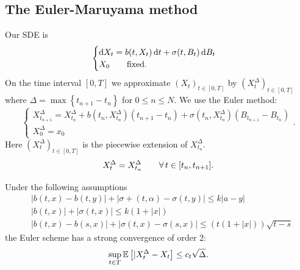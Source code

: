 \documentclass[12pt]{report}
\begin{document}
\subsection{The Euler-Maruyama method}
Our SDE is
\begin{equation*}
	\begin{cases}
		\mathop{}\!\mathrm{d} X_t=b(t,X_t)\mathop{}\!\mathrm{d} t+\sigma(t,B_t)\mathop{}\!\mathrm{d} B_t\\
		X_0\qquad\text{fixed}.
	\end{cases}
\end{equation*}
On the time interval $[0,T]$ we approximate ${(X_{t})}_{t\in[0,T]}$ by ${(X^{\Delta}_{t})}_{t\in[0,T]}$ where $\Delta=\max\left\{t_{n+1}-t_{n}\right\}$ for $0\leq n\leq N$. We use the Euler method:
\begin{equation*}
	\begin{cases}
		X^{\Delta}_{t_{n+1}}=X^{\Delta}_{t_{n}}+b(t_{n},X_{t_{n}}^{\Delta})(t_{n+1}-t_{n})+\sigma(t_{n},X^{\Delta}_{t_{n}})(B_{t_{n+1}}-B_{t_{n}})\\
		X^{\Delta}_0=x_0
	\end{cases}.
\end{equation*}
Here ${(X^{\Delta}_{t})}_{t\in[0,T]}$ is the piecewise extension of $X^{\Delta}_{t_{n}}$.
\begin{equation*}
	X^{\Delta}_{t}=X^{\Delta}_{t_{n}}\qquad\forall\, t\in[t_{n},t_{n+1}].
\end{equation*}
\begin{theorem}
	Under the following assumptions
	\begin{align*}
		&|b(t,x)-b(t,y)|+|\sigma+(t,\alpha)-\sigma(t,y)|\leq k|a-y|\\
		&|b(t,x)|+|\sigma(t,x)|\leq k(1+|x|)\\
		&|b(t,x)-b(s,x)|+|\sigma(t,x)-\sigma(s,x)|\leq(t(1+|x|))\sqrt{t-s}
	\end{align*}
	the Euler scheme has a strong convergence of order 2:
	\begin{equation*}
		\sup_{t\in T}\mathbb{E}\left[|X^{\Delta}_{t}-X_{t}\right]\leq c_{t}\sqrt{\Delta}.
	\end{equation*}
\end{theorem}
\end{document}
